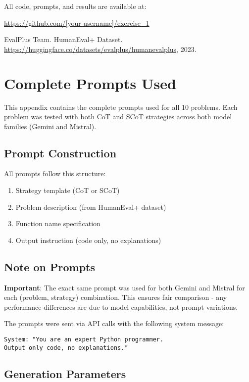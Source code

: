 \documentclass[11pt]{article}
\begin{document}
All code, prompts, and results are available at:

\url{https://github.com/[your-username]/exercise_1}

\begin{thebibliography}{9}
EvalPlus Team. HumanEval+ Dataset. 
\url{https://huggingface.co/datasets/evalplus/humanevalplus}, 2023.
\end{thebibliography}

\newpage
\appendix
\section{Complete Prompts Used}

This appendix contains the complete prompts used for all 10 problems. Each problem was tested with both CoT and SCoT strategies across both model families (Gemini and Mistral).

\subsection{Prompt Construction}

All prompts follow this structure:
\begin{enumerate}
    \item Strategy template (CoT or SCoT)
    \item Problem description (from HumanEval+ dataset)
    \item Function name specification
    \item Output instruction (code only, no explanations)
\end{enumerate}

\subsection{Note on Prompts}

\textbf{Important}: The exact same prompt was used for both Gemini and Mistral for each (problem, strategy) combination. This ensures fair comparison - any performance differences are due to model capabilities, not prompt variations.

The prompts were sent via API calls with the following system message:
\begin{lstlisting}
System: "You are an expert Python programmer. 
Output only code, no explanations."
\end{lstlisting}

\subsection{Generation Parameters}
\end{document}
